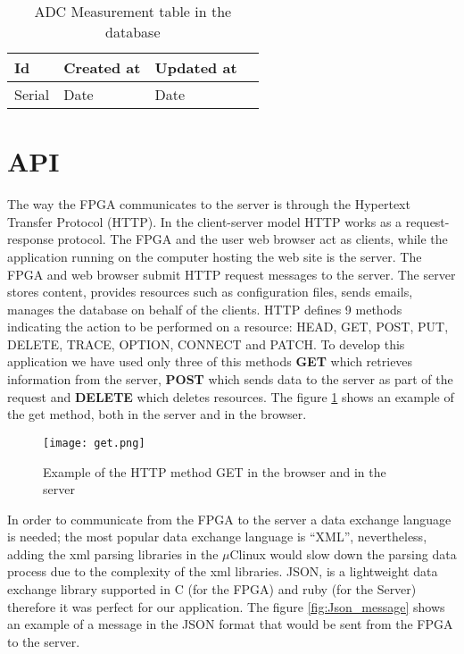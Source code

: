 \begin{table}[h!]
\centering
    \begin{tabular}{| l | l | l | l |}
	\hline
       Id & Created at & Updated at \\ \hline
       Serial & Date & Date\\ \hline
    \end{tabular}
    \caption{ADC Measurement table in the database}
    \label{tab:ADC_measurement_table}
\end{table}


\section{API}

The way the FPGA communicates to the server is through the Hypertext Transfer Protocol (HTTP). In the client-server model HTTP works as a request-response protocol. The FPGA and the user web browser act as clients, while the application running
on the computer hosting the web site is the server. The FPGA and web browser submit HTTP request messages to the server. The server stores content, provides resources such as configuration files, sends emails, manages the database on behalf of the clients.
HTTP defines 9 methods indicating the action to be performed on a resource: HEAD, GET, POST, PUT, DELETE, TRACE, OPTION, CONNECT and PATCH. To develop this application we have used only three of this methods {\bf GET} which retrieves information from the server,
{\bf POST} which sends data to the server as part of the request and {\bf DELETE} which deletes resources. The figure \ref{fig:get_example} shows an example of the get method, both in the server and in the browser.

\begin{figure}[htb]
\centering
\texttt{[image: get.png]}
\caption{Example of the HTTP method GET in the browser and in the server}
\label{fig:get_example}
\end{figure}

In order to communicate from the FPGA to the server a data exchange language is needed; the most popular data exchange language is ``XML'', nevertheless, adding the xml parsing libraries in the $\mu$Clinux
would slow down the parsing data process due to the complexity of the xml libraries. JSON, is a lightweight data exchange library supported in C (for the FPGA) and ruby (for the Server) therefore it was perfect
for our application. The figure \ref{fig:Json_message} shows an example of a message in the JSON format that would be sent from the FPGA to the server.

